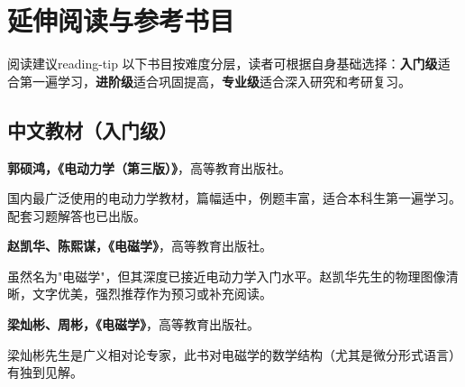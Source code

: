 \documentclass[11pt,a4paper,openany,oneside]{book}
\begin{document}
\chapter{延伸阅读与参考书目}

\begin{tip}{阅读建议}{reading-tip}
以下书目按难度分层，读者可根据自身基础选择：\textbf{入门级}适合第一遍学习，\textbf{进阶级}适合巩固提高，\textbf{专业级}适合深入研究和考研复习。
\end{tip}

\section*{中文教材（入门级）}
\begin{enumerate}[label={[\arabic*]}]
\item \textbf{郭硕鸿，《电动力学（第三版）》}，高等教育出版社。\par
  国内最广泛使用的电动力学教材，篇幅适中，例题丰富，适合本科生第一遍学习。配套习题解答也已出版。

\item \textbf{赵凯华、陈熙谋，《电磁学》}，高等教育出版社。\par
  虽然名为"电磁学"，但其深度已接近电动力学入门水平。赵凯华先生的物理图像清晰，文字优美，强烈推荐作为预习或补充阅读。

\item \textbf{梁灿彬、周彬，《电磁学》}，高等教育出版社。\par
  梁灿彬先生是广义相对论专家，此书对电磁学的数学结构（尤其是微分形式语言）有独到见解。
\end{enumerate}
\end{document}
